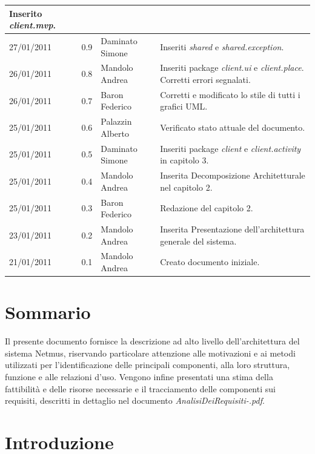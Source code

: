 \begin{longtable}{|p{}|c|p{}|p{}|}
Inserito \emph{client.mvp}.\\
\hline
27/01/2011 & 0.9 & Daminato Simone & Inseriti \emph{shared} e
\emph{shared.exception}.\\
\hline
26/01/2011 & 0.8 & Mandolo Andrea & Inseriti package \emph{client.ui} e
\emph{client.place}. Corretti errori segnalati.\\
\hline
26/01/2011 & 0.7 & Baron Federico & Corretti e modificato lo stile di tutti i
grafici UML.\\
\hline
25/01/2011 & 0.6 & Palazzin Alberto & Verificato stato attuale del documento.\\
\hline
25/01/2011 & 0.5 & Daminato Simone & Inseriti package \emph{client} e
\emph{client.activity} in capitolo 3.\\
\hline
25/01/2011 & 0.4 & Mandolo Andrea & Inserita Decomposizione Architetturale nel
capitolo 2.\\
\hline
25/01/2011 & 0.3 & Baron Federico & Redazione del capitolo 2.\\
\hline
23/01/2011 & 0.2 & Mandolo Andrea & Inserita Presentazione dell'architettura
generale del sistema.\\
\hline
21/01/2011 & 0.1 & Mandolo Andrea & Creato documento iniziale.\\

\end{longtable}

\tableofcontents

\chapter*{Sommario}
Il presente documento fornisce la descrizione ad alto livello dell'architettura
del sistema Netmus, riservando particolare attenzione alle motivazioni e ai
metodi utilizzati per l'identificazione delle principali componenti, alla loro
struttura, funzione e alle relazioni d'uso. Vengono infine presentati una stima
della fattibilit\`a e delle risorse necessarie e il tracciamento delle
componenti sui requisiti, descritti in dettaglio nel documento
\emph{AnalisiDeiRequisiti-\versioneAR.pdf}.


\thispagestyle{fancy} %

\chapter{Introduzione}
\thispagestyle{fancy} %


